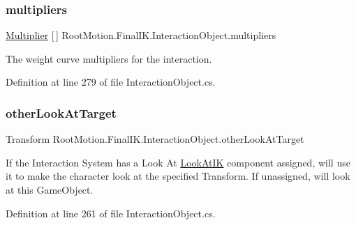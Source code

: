 \subsubsection{\texorpdfstring{multipliers}{multipliers}}
{\footnotesize\ttfamily \mbox{\hyperlink{class_root_motion_1_1_final_i_k_1_1_interaction_object_1_1_multiplier}{Multiplier}} \mbox{[}$\,$\mbox{]} Root\+Motion.\+Final\+I\+K.\+Interaction\+Object.\+multipliers}



The weight curve multipliers for the interaction. 



Definition at line 279 of file Interaction\+Object.\+cs.

\mbox{\label{class_root_motion_1_1_final_i_k_1_1_interaction_object_a75b123a9c0b837079def9544569923b4}} 
\subsubsection{\texorpdfstring{other\+Look\+At\+Target}{otherLookAtTarget}}
{\footnotesize\ttfamily Transform Root\+Motion.\+Final\+I\+K.\+Interaction\+Object.\+other\+Look\+At\+Target}



If the Interaction System has a \textquotesingle{}Look At\textquotesingle{} \mbox{\hyperlink{class_root_motion_1_1_final_i_k_1_1_look_at_i_k}{Look\+At\+IK}} component assigned, will use it to make the character look at the specified Transform. If unassigned, will look at this Game\+Object. 



Definition at line 261 of file Interaction\+Object.\+cs.

\mbox{\label{class_root_motion_1_1_final_i_k_1_1_interaction_object_a6f08d5b22b8286aad0168efdf1340353}} 
